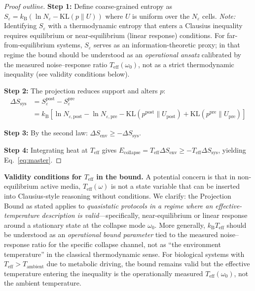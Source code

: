 \documentclass[12pt]{article}
\numberwithin{equation}{section}
\newcommand{\kB}{k_{\mathrm{B}}}
\newcommand{\Teff}{T_{\mathrm{eff}}}
\begin{document}
\begin{proof}[Proof outline]
\textbf{Step 1:} Define coarse-grained entropy as $S_\varepsilon = \kB(\ln N_\varepsilon - \mathrm{KL}(p\|U))$ where $U$ is uniform over the $N_\varepsilon$ cells. \emph{Note:} Identifying $S_\varepsilon$ with a thermodynamic entropy that enters a Clausius inequality requires equilibrium or near-equilibrium (linear response) conditions. For far-from-equilibrium systems, $S_\varepsilon$ serves as an information-theoretic proxy; in that regime the bound should be understood as an \emph{operational ansatz} calibrated by the measured noise--response ratio $\Teff(\omega_0)$, not as a strict thermodynamic inequality (see validity conditions below).

\textbf{Step 2:} The projection reduces support and alters $p$:
\begin{align}
\Delta S_{\mathrm{sys}} &= S_\varepsilon^{\mathrm{post}} - S_\varepsilon^{\mathrm{pre}} \\
&= \kB[\ln N_{\varepsilon,\mathrm{post}} - \ln N_{\varepsilon,\mathrm{pre}} - \mathrm{KL}(p^{\mathrm{post}}\|U_{\mathrm{post}}) + \mathrm{KL}(p^{\mathrm{pre}}\|U_{\mathrm{pre}})]
\end{align}

\textbf{Step 3:} By the second law: $\Delta S_{\mathrm{env}} \ge -\Delta S_{\mathrm{sys}}$.

\textbf{Step 4:} Integrating heat at $\Teff$ gives $E_{\mathrm{collapse}} = \Teff\Delta S_{\mathrm{env}} \ge -\Teff\Delta S_{\mathrm{sys}}$, yielding Eq.~\ref{eq:master}.
\end{proof}

\textbf{Validity conditions for $\Teff$ in the bound.}
A potential concern is that in non-equilibrium active media, $\Teff(\omega)$ is not a state variable that can be inserted into Clausius-style reasoning without conditions. We clarify: the Projection Bound as stated applies to \emph{quasistatic protocols in a regime where an effective-temperature description is valid}---specifically, near-equilibrium or linear response around a stationary state at the collapse mode $\omega_0$. More generally, $\kB\Teff$ should be understood as an \emph{operational bound parameter} tied to the measured noise--response ratio for the specific collapse channel, not as ``the environment temperature'' in the classical thermodynamic sense. For biological systems with $\Teff > T_{\mathrm{ambient}}$ due to metabolic driving, the bound remains valid but the effective temperature entering the inequality is the operationally measured $\Teff(\omega_0)$, not the ambient temperature.
\end{document}
